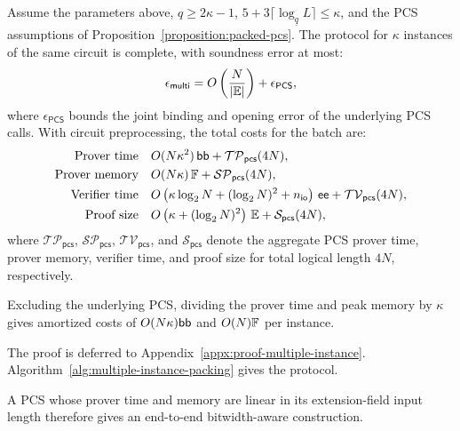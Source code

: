 \begin{theorem}
\label{theorem:multiple-instance-packing}
Assume the parameters above, \(q\geq2\kappa-1\),
\(5+3\lceil\log_{\underline q}L\rceil\leq\kappa\), and the PCS
assumptions of Proposition~\ref{proposition:packed-pcs}.
The protocol for \(\kappa\) instances of the same circuit
is complete, with soundness error at most:
\begin{equation}
    \epsilon_{\mathsf{multi}}
       =O\left(\frac{N}{|\mathbb{E}|}\right)
          +\epsilon_{\mathsf{PCS}},
\label{eq:together-multiple-soundness}
\end{equation}
where \(\epsilon_{\mathsf{PCS}}\) bounds the joint binding and
opening error of the underlying PCS calls.
With circuit preprocessing, the total costs for the batch are:
\begin{equation}
\begin{aligned}
    \text{Prover time}\quad
       &O(N\kappa^2)\,\mathsf{bb}+\mathcal{TP}_{\mathsf{pcs}}(4N),\\
    \text{Prover memory}\quad
       &O(N\kappa)\,{\mathbb{F}}+\mathcal{SP}_{\mathsf{pcs}}(4N),\\
    \text{Verifier time}\quad
       &O\left(\kappa\log_2N+(\log_2N)^2
          +n_{\mathsf{io}}\right)\,\mathsf{ee}+\mathcal{TV}_{\mathsf{pcs}}(4N),\\
    \text{Proof size}\quad
       &O\left(\kappa+(\log_2N)^2\right)\,\mathbb{E}+\mathcal{S}_{\mathsf{pcs}}(4N),
\end{aligned}
\label{eq:together-multiple-efficiency}
\end{equation}
where \(\mathcal{TP}_{\mathsf{pcs}}\),
\(\mathcal{SP}_{\mathsf{pcs}}\),
\(\mathcal{TV}_{\mathsf{pcs}}\), and
\(\mathcal{S}_{\mathsf{pcs}}\) denote the aggregate PCS prover
time, prover memory, verifier time, and proof size for total
logical length \(4N\), respectively.

Excluding the underlying PCS, dividing the prover time and peak
memory by \(\kappa\)
gives amortized costs of \(O(N\kappa)\mathsf{bb}\) and
\(O(N){\mathbb{F}}\) per instance.
\end{theorem}

The proof is deferred to
Appendix~\ref{appx:proof-multiple-instance}.
Algorithm~\ref{alg:multiple-instance-packing} gives the protocol.

A PCS whose prover time and memory are linear in its
extension-field input length therefore gives an end-to-end
bitwidth-aware construction.
\fi
